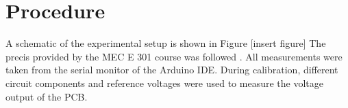 \section{Procedure}

A schematic of the experimental setup is shown in Figure [insert figure]
The precis provided by the MEC E 301 course was followed \cite{lab2precis}. All measurements were taken from the serial monitor
of the Arduino IDE. During calibration, different circuit components and reference voltages were used to measure the voltage output of 
the PCB. 






